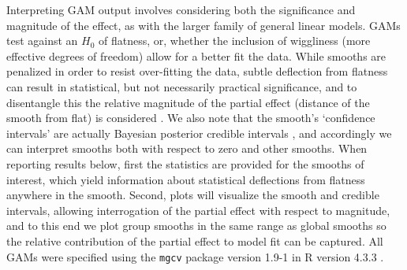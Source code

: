 \documentclass[12pt]{article}
\begin{document}
Interpreting GAM output involves considering both the significance and magnitude of the effect, as with the larger family of general linear models. GAMs test against an $H_0$ of flatness, or, whether the inclusion of wiggliness (more effective degrees of freedom) allow for a better fit the data. While smooths are penalized in order to resist over-fitting the data, subtle deflection from flatness can result in statistical, but not necessarily practical significance, and to disentangle this the relative magnitude of the partial effect (distance of the smooth from flat) is considered \parencite{baayen2020IntroductionGeneralizedAdditive}. We also note that the smooth's `confidence intervals' are actually Bayesian posterior credible intervals \parencite{pedersen2019HierarchicalGeneralizedAdditive}, and accordingly we can interpret smooths both with respect to zero and other smooths. When reporting results below, first the statistics are provided for the smooths of interest, which yield information about statistical deflections from flatness anywhere in the smooth. Second, plots will visualize the smooth and credible intervals, allowing interrogation of the partial effect with respect to magnitude, and to this end we plot group smooths in the same range as global smooths so the relative contribution of the partial effect to model fit can be captured. All GAMs were specified using the \lstinline{mgcv} package version 1.9-1 \parencite{wood2017GeneralizedAdditiveModels} in R version 4.3.3 \parencite{rcoreteam2023LanguageEnvironmentStatistical}.
\end{document}
